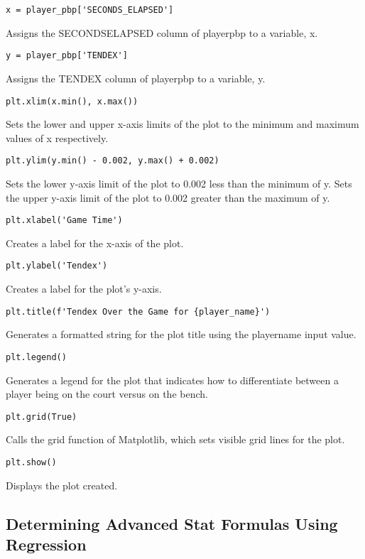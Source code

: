 \documentclass{article}
\begin{document}
\begin{lstlisting}
x = player_pbp['SECONDS_ELAPSED']
\end{lstlisting}
Assigns the SECONDS\textunderscore ELAPSED column of player\textunderscore pbp to a variable, x.
\begin{lstlisting}
y = player_pbp['TENDEX']
\end{lstlisting}
Assigns the TENDEX column of player\textunderscore pbp to a variable, y.
\begin{lstlisting}
plt.xlim(x.min(), x.max())
\end{lstlisting}
Sets the lower and upper x-axis limits of the plot to the minimum and maximum values of x respectively.
\begin{lstlisting}
plt.ylim(y.min() - 0.002, y.max() + 0.002)
\end{lstlisting}
Sets the lower y-axis limit of the plot to 0.002 less than the minimum of y. Sets the upper y-axis limit of the plot to 0.002 greater than the maximum of y.
\begin{lstlisting}
plt.xlabel('Game Time')
\end{lstlisting}
Creates a label for the x-axis of the plot.
\begin{lstlisting}
plt.ylabel('Tendex')
\end{lstlisting}
Creates a label for the plot's y-axis.
\begin{lstlisting}
plt.title(f'Tendex Over the Game for {player_name}')
\end{lstlisting}
Generates a formatted string for the plot title using the player\textunderscore name input value.
\begin{lstlisting}
plt.legend()
\end{lstlisting}
Generates a legend for the plot that indicates how to differentiate between a player being on the court versus on the bench.
\begin{lstlisting}
plt.grid(True)
\end{lstlisting}
Calls the grid function of Matplotlib, which sets visible grid lines for the plot.
\begin{lstlisting}
plt.show()
\end{lstlisting}
Displays the plot created.

\subsection{Determining Advanced Stat Formulas Using Regression}
\end{document}
